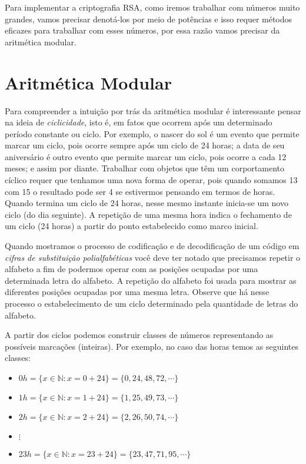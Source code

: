 Para implementar a criptografia RSA, como iremos trabalhar com n\'{u}meros muito grandes, vamos precisar denot\'{a}-los por meio de pot\^{e}ncias e isso requer m\'{e}todos 
eficazes para trabalhar com esses n\'{u}meros, por essa raz\~ao vamos precisar da aritm\'{e}tica modular.  


\section{Aritm\'{e}tica Modular}

Para compreender a intui\c{c}\~{a}o por tr\'{a}s da aritm\'{e}tica modular \'{e} interessante pensar na ideia de \textit{ciclicidade}, 
isto \'{e}, em
fatos que ocorrem ap\'{o}s um determinado per\'{i}odo constante ou ciclo. Por exemplo, o nascer do sol \'{e} um evento que 
permite marcar um ciclo, pois ocorre sempre ap\'{o}s um ciclo de 24 horas; a data de seu anivers\'{a}rio \'{e} outro evento que permite marcar um ciclo, pois ocorre a cada 12 meses; e assim por diante. Trabalhar com objetos que t\^{e}m um corportamento c\'{i}clico requer que tenhamos uma nova forma de operar, pois quando somamos 13 com 15 o resultado pode ser 4 se estivermos pensando em termos de horas. Quando termina um ciclo de 24 horas, nesse mesmo instante inicia-se um novo ciclo (do dia seguinte). A repeti\c{c}\~{a}o de uma mesma hora indica o fechamento de um ciclo (24 horas) a partir do ponto estabelecido como marco inicial. 

Quando mostramos o processo de codifica\c{c}\~{a}o e de decodifica\c{c}\~{a}o de um c\'{o}digo em 
\textit{cifras de substitui\c{c}\~{a}o polialfab\'{e}ticas} voc\^{e} deve ter notado que precisamos repetir o alfabeto 
a fim de podermos operar com as posi\c{c}\~{o}es ocupadas por uma determinada letra do alfabeto. A repeti\c{c}\~{a}o do alfabeto 
foi usada para mostrar as diferentes posi\c{c}\~{o}es ocupadas por uma mesma letra. Observe que h\'{a} nesse processo o 
estabelecimento de um ciclo determinado pela quantidade de letras do alfabeto.

A partir dos ciclos podemos construir classes de n\'{u}meros representando as poss\'{i}veis marca\c{c}\~{o}es (inteiras). Por exemplo,  
no caso das horas temos as seguintes classes:  

\begin{itemize}
	\item $0h=\{x\in\mathbb{N}: x=0+24\}=\{0, 24, 48, 72, \cdots\}$ 
	\item $1h=\{x\in\mathbb{N}: x=1+24\}=\{1, 25, 49, 73, \cdots\}$
	\item $2h=\{x\in\mathbb{N}: x=2+24\}=\{2, 26, 50, 74, \cdots\}$
	\item $\vdots$
	\item $23h=\{x\in\mathbb{N}: x=23+24\}=\{23, 47, 71, 95, \cdots\}$
\end{itemize}

